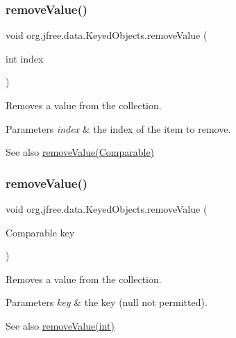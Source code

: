 \subsubsection{\texorpdfstring{remove\+Value()}{removeValue()}\hspace{0.1cm}{\footnotesize\ttfamily [1/2]}}
{\footnotesize\ttfamily void org.\+jfree.\+data.\+Keyed\+Objects.\+remove\+Value (\begin{DoxyParamCaption}\item[{int}]{index }\end{DoxyParamCaption})}

Removes a value from the collection.


\begin{DoxyParams}{Parameters}
{\em index} & the index of the item to remove.\\
\hline
\end{DoxyParams}
\begin{DoxySeeAlso}{See also}
\mbox{\hyperlink{classorg_1_1jfree_1_1data_1_1_keyed_objects_af180842c9a65ae9255d1996c71ae9da7}{remove\+Value(\+Comparable)}} 
\end{DoxySeeAlso}
\mbox{\label{classorg_1_1jfree_1_1data_1_1_keyed_objects_af180842c9a65ae9255d1996c71ae9da7}} 
\subsubsection{\texorpdfstring{remove\+Value()}{removeValue()}\hspace{0.1cm}{\footnotesize\ttfamily [2/2]}}
{\footnotesize\ttfamily void org.\+jfree.\+data.\+Keyed\+Objects.\+remove\+Value (\begin{DoxyParamCaption}\item[{Comparable}]{key }\end{DoxyParamCaption})}

Removes a value from the collection.


\begin{DoxyParams}{Parameters}
{\em key} & the key ({\ttfamily null} not permitted).\\
\hline
\end{DoxyParams}
\begin{DoxySeeAlso}{See also}
\mbox{\hyperlink{classorg_1_1jfree_1_1data_1_1_keyed_objects_af0370d9fe51c22aca2b3e429983069c0}{remove\+Value(int)}}
\end{DoxySeeAlso}

